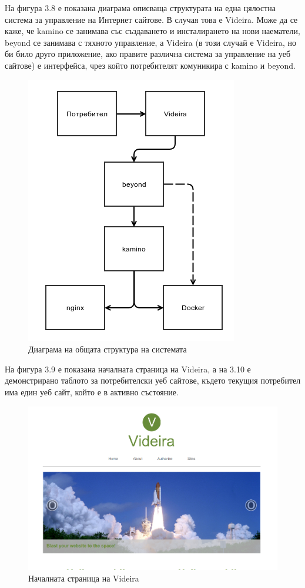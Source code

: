 \documentclass[pdftex,14pt,a4paper]{extreport}
\begin{document}
На фигура 3.8 е показана диаграма описваща структурата на една цялостна система за управление на Интернет сайтове. В случая това е Videira. Може да се каже, че kamino се занимава със създаването и инсталирането на нови наематели, beyond се занимава с тяхното управление, а Videira (в този случай е Videira, но би било друго приложение, ако правите различна система за управление на уеб сайтове) е интерфейса, чрез който потребителят комуникира с kamino и beyond.
\begin{figure}[h]
  \centering
  \includegraphics [scale=0.7]{./diagram_all}
  \caption {Диаграма на общата структура на системата}
\end{figure}
На фигура 3.9 е показана началната страница на Videira, а на 3.10 е демонстрирано таблото за потребителски уеб сайтове, където текущия потребител има един уеб сайт, който е в активно състояние.
\begin{figure}[h]
  \centering
  \includegraphics [scale=0.42]{./videira_index}
  \caption {Началната страница на Videira}
\end{figure}
\end{document}
